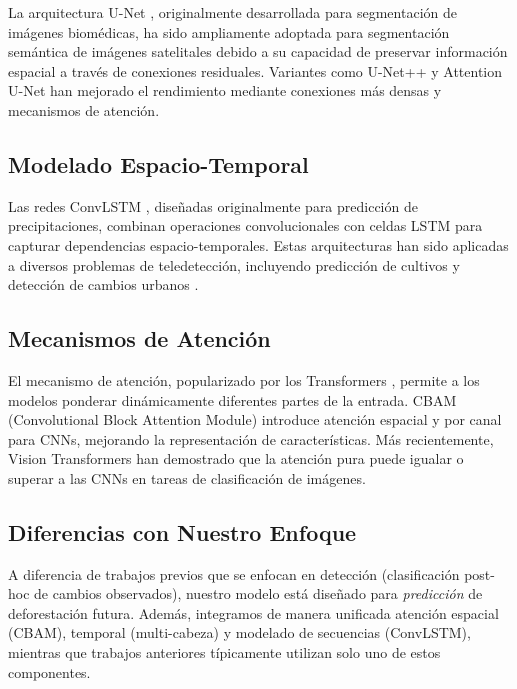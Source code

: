 \documentclass[conference]{IEEEtran}
\begin{document}
La arquitectura U-Net \cite{ronneberger2015unet}, originalmente desarrollada para segmentación de imágenes biomédicas, ha sido ampliamente adoptada para segmentación semántica de imágenes satelitales debido a su capacidad de preservar información espacial a través de conexiones residuales. Variantes como U-Net++ \cite{zhou2018unet++} y Attention U-Net \cite{oktay2018attention} han mejorado el rendimiento mediante conexiones más densas y mecanismos de atención.

\subsection{Modelado Espacio-Temporal}

Las redes ConvLSTM \cite{shi2015convolutional}, diseñadas originalmente para predicción de precipitaciones, combinan operaciones convolucionales con celdas LSTM para capturar dependencias espacio-temporales. Estas arquitecturas han sido aplicadas a diversos problemas de teledetección, incluyendo predicción de cultivos \cite{russwurm2018temporal} y detección de cambios urbanos \cite{papadomanolaki2021deep}.

\subsection{Mecanismos de Atención}

El mecanismo de atención, popularizado por los Transformers \cite{vaswani2017attention}, permite a los modelos ponderar dinámicamente diferentes partes de la entrada. CBAM (Convolutional Block Attention Module) \cite{woo2018cbam} introduce atención espacial y por canal para CNNs, mejorando la representación de características. Más recientemente, Vision Transformers \cite{dosovitskiy2020image} han demostrado que la atención pura puede igualar o superar a las CNNs en tareas de clasificación de imágenes.

\subsection{Diferencias con Nuestro Enfoque}

A diferencia de trabajos previos que se enfocan en detección (clasificación post-hoc de cambios observados), nuestro modelo está diseñado para \textit{predicción} de deforestación futura. Además, integramos de manera unificada atención espacial (CBAM), temporal (multi-cabeza) y modelado de secuencias (ConvLSTM), mientras que trabajos anteriores típicamente utilizan solo uno de estos componentes.
\end{document}
